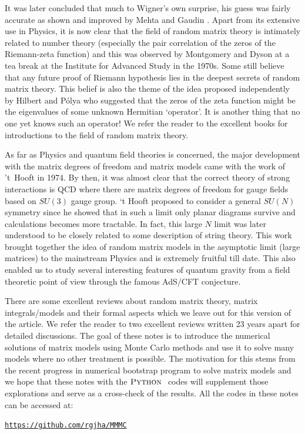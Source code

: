 \documentclass[11pt]{article}
\newcommand{\PY}{\textsc{Python }}
\begin{document}
It was later concluded that much to Wigner's own surprise, 
his guess was fairly accurate as shown and improved by Mehta \cite{MEHTA1960395} and 
Gaudin \cite{GAUDIN1961447}. Apart from its extensive use in Physics, it is now clear that 
the field of random matrix theory is intimately related to number theory 
(especially the pair correlation of the zeros of the Riemann-zeta function) and this was 
observed by Montgomery and Dyson at a tea break at the Institute for Advanced 
Study in the 1970s. Some still believe that any future proof of Riemann hypothesis lies in the
deepest secrets of random matrix theory. This belief is also the theme of the idea proposed 
independently by  Hilbert and P\'{o}lya who suggested that the zeros of the zeta function 
might be the eigenvalues of some unknown Hermitian `operator'. It is another thing that 
no one yet knows such an operator! We refer the reader to the excellent books 
\cite{Meh2004, Akemann:2011csh} for introductions to the field of random matrix theory. 

As far as Physics and quantum field theories is concerned, the major development
with the matrix degrees of freedom and matrix models came 
with the work of 't~Hooft in 1974. By then, it was almost clear that the correct theory of 
strong interactions is QCD where there are matrix degrees of freedom for gauge fields
based on $SU(3)$ gauge group. `t Hooft proposed to consider a general $SU(N)$ 
symmetry since he showed that in such a limit only planar diagrams survive and calculations becomes
more tractable. In fact, this large $N$ limit was later understood to be closely related to some
description of string theory. This work brought together the idea of random matrix models
in the asymptotic limit (large matrices) to the mainstream Physics and is extremely fruitful till date. 
This also enabled us to study several interesting features of quantum gravity 
from a field theoretic point of view through the famous AdS/CFT conjecture.

There are some excellent reviews about random matrix theory, matrix integrals/models and their formal aspects 
which we leave out for this version of the article. We refer the reader to two excellent reviews written 23 years apart \cite{DiFrancesco:1993cyw,Eynard:2015aea} for detailed discussions. 
The goal of these notes is to introduce the numerical solutions of matrix models using 
Monte Carlo methods and use it to solve many models where no other treatment is possible. 
The motivation for this stems from the recent progress in numerical bootstrap program to 
solve matrix models and we hope that these notes with the $\PY$ codes will supplement
those explorations and serve as a cross-check of the results. All the codes in these notes can be accessed at:  
\begin{center} \texttt{\href{https://github.com/rgjha/MMMC}{https://github.com/rgjha/MMMC}} \end{center}
\end{document}
